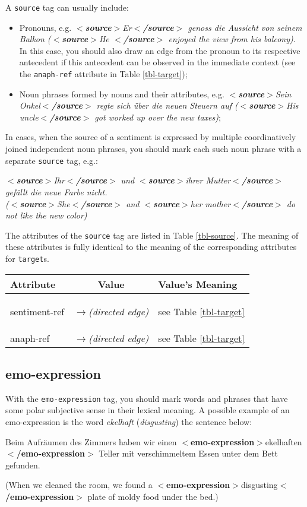 \documentclass[11pt,a4paper]{article}
\newcommand{\xmltag}[1]{{\textbf{\small$<$#1$>$}}}
\newcommand{\source}[1]{\xmltag{source}#1\xmltag{/source}}
\newcommand{\emoexpression}[1]{\xmltag{emo-expression}#1\xmltag{/emo-expression}}
\newlength\clmnwidth
\newenvironment{myexe}{
  \begin{exe}
    \ex\begin{center}
    \itshape
}{
    \end{center}
  \end{exe}
}
\begin{document}
A \texttt{source} tag can usually include:
\begin{itemize}
  \item Pronouns, e.g. \textit{\source{Er} genoss die Aussicht von
    seinem Balkon (\source{He } enjoyed the view from his balcony)}.
    In this case, you should also draw an edge from the pronoun to its
    respective antecedent if this antecedent can be observed in the
    immediate context (see the \texttt{anaph-ref} attribute in Table
    \ref{tbl-target});

  \item Noun phrases formed by nouns and their attributes,
    e.g. \textit{\source{Sein Onkel} regte sich \"uber die neuen
      Steuern auf (\source{His uncle} got worked up over the new
      taxes)};
\end{itemize}
In cases, when the source of a sentiment is expressed by multiple
coordinatively joined independent noun phrases, you should mark each such noun
phrase with a separate \texttt{source} tag, e.g.:
\begin{myexe}\label{ex:2source}
  \source{Ihr} und \source{ihrer Mutter} gef\"allt die neue Farbe
  nicht.\\ (\source{She} and \source{her mother} do not like the new
  color)
\end{myexe}

The attributes of the \texttt{source} tag are listed in Table
\ref{tbl-source}.  The meaning of these attributes is fully identical
to the meaning of the corresponding attributes for \texttt{target}s.
\begin{center}
  \begin{tabular}{|l|c|p{\clmnwidth}|}\hline
    Attribute & Value & Value's Meaning\\\hline\label{tbl-source}

    sentiment-ref & \textit{$\longrightarrow$\newline(directed edge)}
    & see Table \ref{tbl-target}\\\hline

    anaph-ref & \textit{$\longrightarrow$\newline(directed edge)} &
    see Table \ref{tbl-target}\\\hline
  \end{tabular}
\end{center}

\subsection{emo-expression}
With the \texttt{emo-expression} tag, you should mark words and
phrases that have some polar subjective sense in their lexical
meaning.  A possible example of an emo-expression is the word
\textit{ekelhaft} (\textit{disgusting}) the sentence below:
\begin{myexe}
  Beim Aufr\"aumen des Zimmers haben wir einen
  \emoexpression{ekelhaften } Teller mit verschimmeltem Essen unter
  dem Bett gefunden.

  (When we cleaned the room, we found a \emoexpression{disgusting}
  plate of moldy food under the bed.)
\end{myexe}
\end{document}
